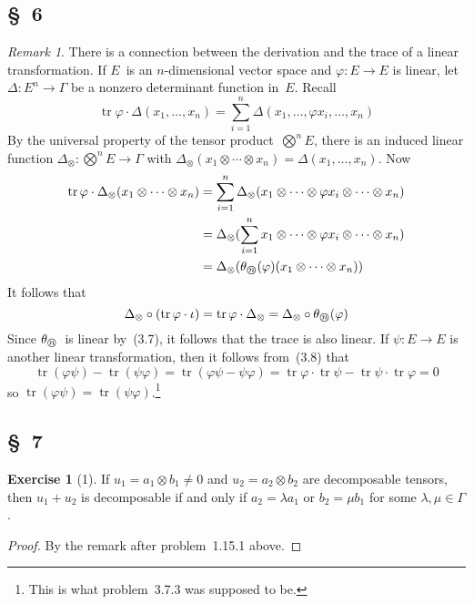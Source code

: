 \documentclass[letterpaper,12pt]{article}
\DeclareMathOperator{\tr}{tr}
\newcommand{\after}{\circ}
\newcommand{\mult}{\cdot}
\newcommand{\tprod}{\otimes}
\newcommand{\bigtprod}{\bigotimes}
\newcommand{\medtprod}{{\textstyle\bigtprod}}
\newcommand{\circled}[1]{\text{\scriptsize\textcircled{\textit{#1}}}}
\theoremstyle{definition}
\newtheorem*{exer}{Exercise}
\theoremstyle{remark}
\newtheorem*{rmk}{Remark}
\begin{document}
\subsection*{\S~6}
\begin{rmk}
There is a connection between the derivation and the trace of a linear transformation. If \(E\)~is an \(n\)-dimensional vector space and \(\varphi:E\to E\) is linear, let \(\Delta:E^n\to\Gamma\) be a nonzero determinant function in~\(E\). Recall
\[\tr\varphi\mult\Delta(x_1,\ldots,x_n)=\sum_{i=1}^n\Delta(x_1,\ldots,\varphi x_i,\ldots,x_n)\]
By the universal property of the tensor product~\(\medtprod^n E\), there is an induced linear function \(\Delta_{\tprod}:\medtprod^n E\to\Gamma\) with \(\Delta_{\tprod}(x_1\tprod\cdots\tprod x_n)=\Delta(x_1,\ldots,x_n)\).
Now
\begin{align*}
\tr\varphi\mult\Delta_{\tprod}(x_1\tprod\cdots\tprod x_n)&=\sum_{i=1}^n \Delta_{\tprod}(x_1\tprod\cdots\tprod\varphi x_i\tprod\cdots\tprod x_n)\\
	&=\Delta_{\tprod}(\sum_{i=1}^n x_1\tprod\cdots\tprod\varphi x_i\tprod\cdots\tprod x_n)\\
	&=\Delta_{\tprod}(\theta_{\circled{n}}(\varphi)(x_1\tprod\cdots\tprod x_n))
\end{align*}
It follows that
\[\Delta_{\tprod}\after(\tr\varphi\mult\iota)=\tr\varphi\mult\Delta_{\tprod}=\Delta_{\tprod}\after\theta_{\circled{n}}(\varphi)\]
Since \(\theta_{\circled{n}}\)~is linear by~(3.7), it follows that the trace is also linear. If \(\psi:E\to E\) is another linear transformation, then it follows from~(3.8) that
\[\tr(\varphi\psi)-\tr(\psi\varphi)=\tr(\varphi\psi-\psi\varphi)=\tr\varphi\mult\tr\psi-\tr\psi\mult\tr\varphi=0\]
so \(\tr(\varphi\psi)=\tr(\psi\varphi)\).\footnote{This is what problem~3.7.3 was supposed to be.}
\end{rmk}

\subsection*{\S~7}
\begin{exer}[1]
If \(u_1=a_1\tprod b_1\ne 0\) and \(u_2=a_2\tprod b_2\) are decomposable tensors, then \(u_1+u_2\) is decomposable if and only if \(a_2=\lambda a_1\) or \(b_2=\mu b_1\) for some \(\lambda,\mu\in\Gamma\).
\end{exer}
\begin{proof}
By the remark after problem~1.15.1 above.
\end{proof}
\end{document}
